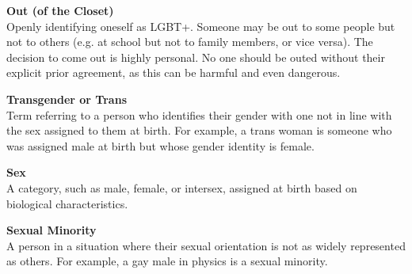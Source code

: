 \begin{titlepage}

\noindent\textbf{Out (of the Closet)}\\
Openly identifying oneself as LGBT+. Someone may be out to some people but not to others (e.g. at school but not to family members, or vice versa). The decision to come out is highly personal. No one should be outed without their explicit prior agreement, as this can be harmful and even dangerous.\vspace*{\baselineskip}

\noindent\textbf{Transgender or Trans}\\
Term referring to a person who identifies their gender with one not in line with the sex assigned to them at birth. For example, a trans woman is someone who was assigned male at birth but whose gender identity is female.\vspace*{\baselineskip}


\noindent\textbf{Sex}\\
A category, such as male, female, or intersex, assigned at birth based on biological characteristics.\vspace*{\baselineskip}

\noindent\textbf{Sexual Minority}\\
A person in a situation where their sexual orientation is not as widely represented as others. For example, a gay male in physics is a sexual minority.
\end{titlepage}








